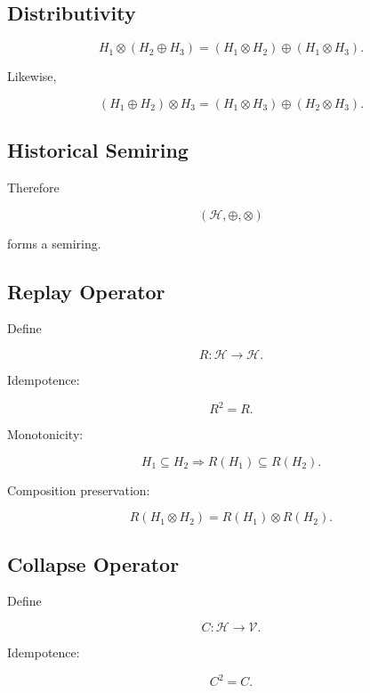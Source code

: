 \documentclass[12pt,oneside]{article}
\theoremstyle{definition}
\theoremstyle{remark}
\begin{document}
\subsection*{Distributivity}

\[
H_1
\otimes
(H_2\oplus H_3)
=
(H_1\otimes H_2)
\oplus
(H_1\otimes H_3).
\]

Likewise,

\[
(H_1\oplus H_2)
\otimes
H_3
=
(H_1\otimes H_3)
\oplus
(H_2\otimes H_3).
\]

\subsection*{Historical Semiring}

Therefore

\[
(\mathcal H,\oplus,\otimes)
\]

forms a semiring.

\subsection*{Replay Operator}

Define

\[
R
:
\mathcal H
\rightarrow
\mathcal H.
\]

Idempotence:

\[
R^2=R.
\]

Monotonicity:

\[
H_1
\subseteq
H_2
\Longrightarrow
R(H_1)
\subseteq
R(H_2).
\]

Composition preservation:

\[
R(H_1\otimes H_2)
=
R(H_1)
\otimes
R(H_2).
\]

\subsection*{Collapse Operator}

Define

\[
C
:
\mathcal H
\rightarrow
\mathcal V.
\]

Idempotence:

\[
C^2=C.
\]
\end{document}
